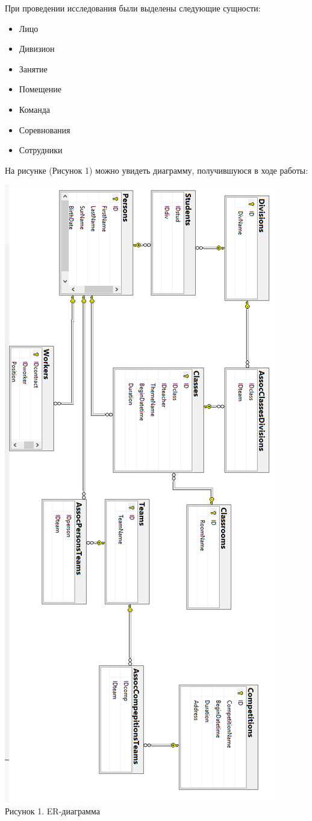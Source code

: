 \documentclass[a4paper,12pt,preview]{report} %
\begin{document}
	При проведении исследования были выделены следующие сущности:
	\begin{itemize}
		\item Лицо
		\item Дивизион
		\item Занятие
		\item Помещение
		\item Команда
		\item Соревнования
		\item Сотрудники
	\end{itemize}
	
	На рисунке (Рисунок 1) можно увидеть диаграмму, получившуюся в ходе работы:
	
	\begin{center}
		\includegraphics[scale=0.6]{ER.PNG}\\
		Рисунок 1. ER-диаграмма
	\end{center}
	
\end{document}
